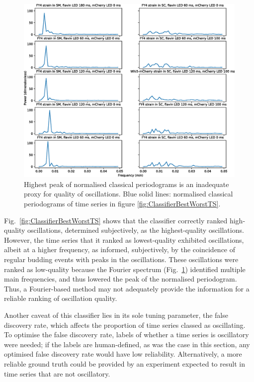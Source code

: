 \begin{figure}[htbp]
  \centering
  \includegraphics[width=\textwidth]{10m_ClassifierBestWorstPS}
  \caption[
    Highest peak of normalised classical periodograms is an inadequate proxy for quality of oscillations
  ]{
    Highest peak of normalised classical periodograms is an inadequate proxy for quality of oscillations.
    Blue solid lines: normalised classical periodograms of time series in figure \ref{fig:ClassifierBestWorstTS}.
  }
  \label{fig:ClassifierBestWorstPS}
\end{figure}

Fig.\ \ref{fig:ClassifierBestWorstTS} shows that the classifier correctly ranked high-quality oscillations, determined subjectively, as the highest-quality oscillations.
However, the time series that it ranked as lowest-quality exhibited oscillations, albeit at a higher frequency, as informed, subjectively, by the coincidence of regular budding events with peaks in the oscillations.
These oscillations were ranked as low-quality because the Fourier spectrum (Fig.\ \ref{fig:ClassifierBestWorstPS}) identified multiple main frequencies, and thus lowered the peak of the normalised periodogram.
Thus, a Fourier-based method may not adequately provide the information for a reliable ranking of oscillation quality.

Another caveat of this classifier lies in its sole tuning parameter, the false discovery rate, which affects the proportion of time series classed as oscillating.
To optimise the false discovery rate, labels of whether a time series is oscillatory were needed; if the labels are human-defined, as was the case in this section, any optimised false discovery rate would have low reliability.
Alternatively, a more reliable ground truth could be provided by an experiment expected to result in time series that are not oscillatory.


